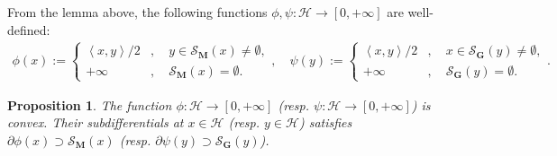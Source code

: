 \documentclass[noinfoline]{imsart}\setcounter{tocdepth}{2}
\newcommand{\m}[1]{\mathbf{#1}} %
\renewcommand{\c}[1]{\mathcal{#1}} %
\newcommand{\innpr}[2]{{\left\langle {#1},{#2}\right\rangle}} %
\theoremstyle{plain}
\newtheorem{proposition}[theorem]{Proposition}
\begin{document}
From the lemma above, the following functions $\phi, \psi: \c{H} \to [0, +\infty]$ are well-defined:
\begin{align*}
    \phi(x) := 
    \begin{cases}
        \innpr{x}{y}/2 &, \quad y \in \c{S}_{\m{M}}(x) \ne \emptyset, \\
        +\infty &, \quad \c{S}_{\m{M}}(x) = \emptyset. 
    \end{cases}, \quad 
    \psi(y) := 
    \begin{cases}
        \innpr{x}{y}/2 &, \quad x \in \c{S}_{\m{G}}(y) \ne \emptyset, \\
        +\infty &, \quad \c{S}_{\m{G}}(y) = \emptyset. 
    \end{cases}.
\end{align*}


\begin{proposition}\label{prop:subdiff}
The function $\phi: \c{H} \to [0, +\infty]$ (resp. $\psi: \c{H} \to [0, +\infty]$) is convex. Their subdifferentials at $x \in \c{H}$ (resp. $y \in \c{H}$) satisfies $\partial \phi(x) \supset \c{S}_{\m{M}}(x)$ (resp. $\partial \psi(y) \supset \c{S}_{\m{G}}(y)$).
\end{proposition}
\end{document}
